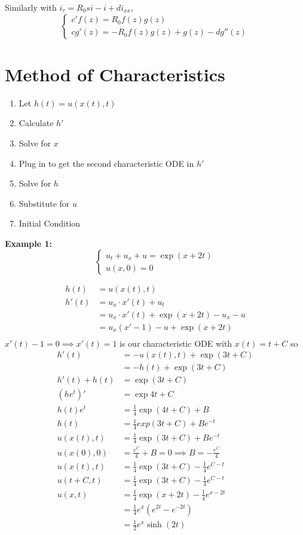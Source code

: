 \documentclass[10pt]{article}
\begin{document}
Similarly with $i_\tau = R_0 si - i + di_{xx}$, 
\[\begin{cases}
    c'f(z) = R_0 f(z)g(z)\\
    cg'(z) = -R_0f(z)g(z) + g(z) - dg''(z)
\end{cases}\]

\section{Method of Characteristics}
\begin{enumerate}
    \item Let $h(t) = u(x(t), t)$
    \item Calculate $h'$
    \item Solve for $x$
    \item Plug in to get the second characteristic ODE in $h'$
    \item Solve for $h$
    \item Substitute for $u$
    \item Initial Condition
\end{enumerate}

\textbf{Example 1:} 
\[\begin{cases}
    u_t + u_x + u = \exp(x + 2t)\\
    u(x, 0)= 0 
\end{cases}\]

\begin{align*}
    h(t) &= u(x(t), t)\\
    h'(t) &= u_x \cdot x'(t) + u_t\\
        &= u_x \cdot x'(t) + \exp(x + 2t) - u_x  - u\\
        &= u_x (x' - 1) - u + \exp(x + 2t)\\
\end{align*}
$x'(t) - 1 = 0 \implies x'(t) = 1$ is our characteristic ODE with $x(t) = t + C$ so 
\begin{align*}
    h'(t) &= -u(x(t), t) + \exp(3t+ C)\\
    &= -h(t) + \exp(3t + C)\\
    h'(t) + h(t) &= \exp(3t + C)\\
    (he^t)' &= \exp{4t+C}\\
    h(t)e^t &= \frac{1}{4}\exp(4t+C) + B\\
    h(t) &= \frac{1}{4}exp(3t+C) + Be^{-t}\\
    u(x(t), t) &= \frac{1}{4}\exp(3t+C) + Be^{-t}\\
    u(x(0), 0) &= \frac{e^C}{4} + B = 0 \implies B = -\frac{e^C}{4}\\
    u(x(t), t) &= \frac{1}{4}\exp(3t+C) -\frac{1}{4}e^{C-t}\\
    u(t + C, t)&= \frac{1}{4}\exp(3t+C) -\frac{1}{4}e^{C-t}\\
    u(x, t) &= \frac{1}{4}\exp(x + 2t) - \frac{1}{4}e^{x - 2t}\\
    &= \frac{1}{4}e^x(e^{2t} - e^{-2t})\\
    &= \frac{1}{2}e^x \sinh(2t)
\end{align*}
\end{document}
